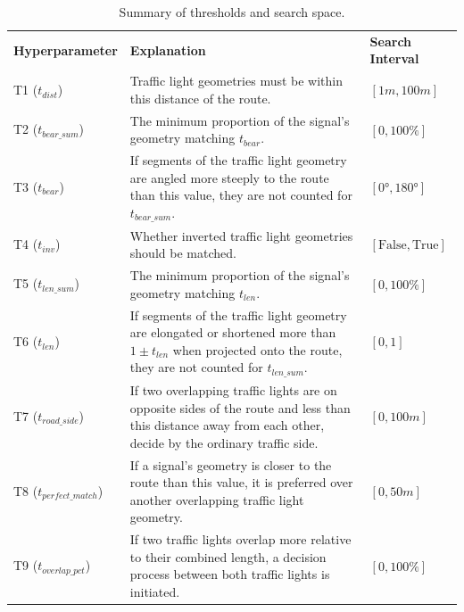 \begin{table}[h]
\caption{Summary of thresholds and search space.}
\begin{tabular}{@{}lp{9.5cm}l@{}}
\toprule
\textbf{Hyperparameter}  & \textbf{Explanation} & \textbf{Search Interval} \\
T1 ($t_{dist}$) & Traffic light geometries must be within this distance of the route. & $[1m, 100m]$ \\
T2 ($t_{bear\_sum}$) & The minimum proportion of the signal's geometry matching $t_{bear}$. & $[0, 100\%]$ \\
T3 ($t_{bear}$) & If segments of the traffic light geometry are angled more steeply to the route than this value, they are not counted for $t_{bear\_sum}$. & $[0°, 180°]$ \\
T4 ($t_{inv}$) & Whether inverted traffic light geometries should be matched. & $[\text{False}, \text{True}]$ \\
T5 ($t_{len\_sum}$) & The minimum proportion of the signal's geometry matching $t_{len}$. & $[0, 100\%]$ \\
T6 ($t_{len}$) & If segments of the traffic light geometry are elongated or shortened more than $1 \pm t_{len}$ when projected onto the route, they are not counted for $t_{len\_sum}$. & $[0, 1]$\\
T7 ($t_{road\_side}$) & If two overlapping traffic lights are on opposite sides of the route and less than this distance away from each other, decide by the ordinary traffic side. & $[0, 100m]$ \\
T8 ($t_{perfect\_match}$) & If a signal's geometry is closer to the route than this value, it is preferred over another overlapping traffic light geometry. & $[0, 50m]$ \\
T9 ($t_{overlap\_pct}$) & If two traffic lights overlap more relative to their combined length, a decision process between both traffic lights is initiated. & $[0, 100\%]$ \\
\bottomrule
\end{tabular}
\label{tab:hyperparameter-space}
\end{table}

